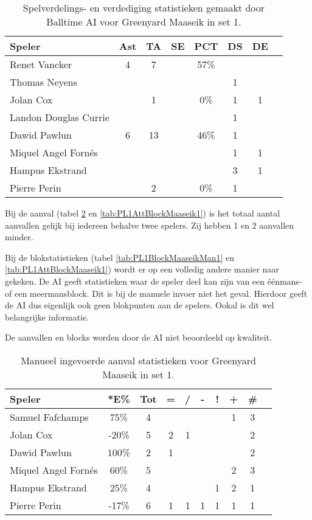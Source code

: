 \begin{table}[ht!]
  \centering
  \scriptsize
  \begin{tabular}{|l|c|c|c|c|c|c|c|}  \hline
    \textbf{Speler} & Ast & TA & SE & PCT & DS & DE \\ \hline
    Renet Vancker & 4 & 7 &  & 57\% &  &  \\
    Thomas Neyens &  &  &  &  & 1 &  \\
    Jolan Cox &  & 1 &  & 0\% & 1 & 1 \\
    Landon Douglas Currie &  &   &  &  & 1 &  \\
    Dawid Pawlun & 6 & 13 &  & 46\% & 1 &  \\
    Miquel Angel Fornés &  &  &  &  & 1 & 1 \\
    Hampus Ekstrand &  &  &  &  & 3 & 1 \\
    Pierre Perin &  & 2 &  & 0\% & 1 &  \\ \hline
  \end{tabular}
  \caption[Spelverdelings- en verdedigingsstatistieken gemaakt door Balltime AI voor Greenyard Maaseik in set 1]{\label{tab:PL1SetDigMaaseikAI1}Spelverdelings- en verdediging statistieken gemaakt door Balltime AI voor Greenyard Maaseik in set 1.}
\end{table}

Bij de aanval (tabel \ref{tab:PL1AttMaaseikMan1} en \ref{tab:PL1AttBlockMaaseik1}) is het totaal aantal aanvallen gelijk bij iedereen behalve twee spelers. Zij hebben 1 en 2 aanvallen minder.

Bij de blokstatistieken (tabel \ref{tab:PL1BlockMaaseikMan1} en \ref{tab:PL1AttBlockMaaseik1}) wordt er op een volledig andere manier naar gekeken. De AI geeft statistieken waar de speler deel kan zijn van een éénmans- of een meermansblock. Dit is bij de manuele invoer niet het geval. Hierdoor geeft de AI dus eigenlijk ook geen blokpunten aan de spelers. Ookal is dit wel belangrijke informatie.

De aanvallen en blocks worden door de AI niet beoordeeld op kwaliteit.

\begin{table}[ht!]
    \centering
    \scriptsize
    \begin{tabular}{|l|c|c|c|c|c|c|c|c|c|} \hline
        \textbf{Speler} & *E\% & Tot & = & / & - & ! & + & \# \\ \hline
        Samuel Fafchamps & 75\% & 4 &  &  &  &  & 1 & 3 \\ 
        Jolan Cox & -20\% & 5 & 2 & 1 &  &  &  & 2 \\ 
        Dawid Pawlun  & 100\% & 2 & 1 &  &  &  &  & 2 \\ 
        Miquel Angel Fornés & 60\% & 5 &  &  &  &  & 2 & 3 \\
        Hampus Ekstrand & 25\% & 4 &  &  &  & 1 & 2 & 1 \\ 
        Pierre Perin & -17\% & 6 & 1 & 1 & 1 & 1 & 1 & 1 \\ \hline
    \end{tabular}
    \caption[Manueel ingevoerde aanvalsstatistieken voor Greenyard Maaseik in set 1]{\label{tab:PL1AttMaaseikMan1}Manueel ingevoerde aanval statistieken voor Greenyard Maaseik in set 1.}
\end{table}

